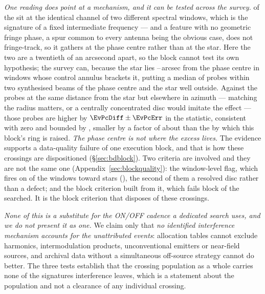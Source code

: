 \emph{One reading does point at a mechanism, and it can be tested across the
survey.} \DqBlockIfMult{} of the \DqBlockNCross{} sit at the identical
channel of two different spectral windows, which is the signature of a fixed
intermediate frequency --- and a feature with no geometric fringe phase, a
spur common to every antenna being the obvious case, does not fringe-track,
so it gathers at the phase centre rather than at the star. Here the two are a
twentieth of an arcsecond apart, so the block cannot test its own hypothesis;
the survey can, because the star lies \EvPcOffLo--\EvPcOffHi\,arcsec from the
phase centre in \EvPcNWin{} windows whose control annulus brackets it,
putting a median of \EvPcNNear{} probes within two synthesised beams of the
phase centre and the star well outside. Against the probes at the same
distance from the star but elsewhere in azimuth --- matching the radius
matters, or a centrally concentrated disc would imitate the effect --- those
probes are higher by $\EvPcDiff\pm\EvPcErr$ in the statistic, consistent with
zero and bounded by \EvPcBound, smaller by a factor of about \EvPcFactor{}
than the \EvPcNeed{} by which this block's ring is raised. \emph{The phase
centre is not where the excess lives.}
The evidence supports a
data-quality failure of one execution block, and that is how these
\EvNCrossFlag{} crossings are dispositioned (\S\ref{sec:bdblock}). Two
criteria are involved and they are not the same one
(Appendix~\ref{sec:blockquality}): the window-level flag, which fires on
\DqNWin{} of the \NWindows{} windows toward \DqNStar{} stars (\DqStars),
the second of them a resolved disc rather than a defect; and the block
criterion built from it, which fails \BqNFail{} block of the \BqNBlocks{}
searched. It is the block criterion that disposes of these crossings.

\emph{None of this is a substitute for the ON/OFF cadence a dedicated search
uses, and we do not present it as one.} We claim only that \emph{no
identified interference mechanism accounts for the unattributed events}:
allocation tables cannot exclude harmonics, intermodulation products,
unconventional emitters or near-field sources, and archival data without a
simultaneous off-source strategy cannot do better. The three tests establish
that the crossing population as a whole carries none of the signatures
interference leaves, which is a statement about the population and not a
clearance of any individual crossing.


